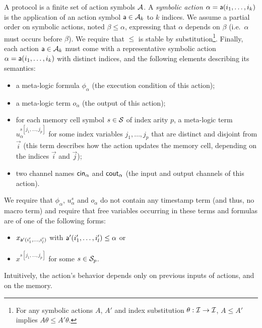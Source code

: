 \begin{definition} \label{def:action} \label{def:proto}
  A protocol is a finite set of action symbols $\mathcal{A}$.
  A \emph{symbolic action} $\alpha = \textsf{a}(i_1,\ldots,i_k)$
  is the application of an action symbol $\textsf{a} \in \mathcal{A}_k$
  to $k$ indices.
  We assume a partial order on symbolic actions,
  noted $\beta \leq \alpha$, expressing that $\alpha$ depends on $\beta$ (i.e.\ $\alpha$ must occurs before $\beta$). We require that $\leq$ is stable by substitution\footnote{
    For any symbolic actions $A$, $A'$ and index substitution $\theta : \mathcal{I} \to \mathcal{I}$,
    $A \leq A'$ implies $A\theta \leq A'\theta$.
  }.
  Finally, each action $\textsf{a} \in \mathcal{A}_k$ must come with
  a representative symbolic action $\alpha = \textsf{a}(i_1,\ldots,i_k)$
  with distinct indices,
  and the following elements describing its semantics:
  \begin{itemize}
    \item a meta-logic formula $\phi_{\alpha}$
      (the execution condition of this action);
    \item a meta-logic term $o_{\alpha}$
      (the output of this action);
    \item for each memory cell symbol $s \in \mathcal{S}$ of index arity $p$,
      a meta-logic term $u_{\alpha}^{s[j_1,\ldots,j_p]}$
      for some index variables $j_1,\ldots,j_p$
      that are distinct and disjoint from $\vec{i}$
      (this term describes how the action updates the memory
      cell, depending on the indices $\vec{i}$ and $\vec{j}$);
    \item two channel names $\mathsf{cin}_\alpha$ and $\mathsf{cout}_\alpha$
      (the input and output channels of this action).
  \end{itemize}
  We require that
  $\phi_{\alpha}$, $u_{\alpha}^{s}$ and $o_{\alpha}$ do not contain any
  timestamp term (and thus, no macro term) and require that
  free variables occurring in these terms and formulas are
  of one of the following forms:
  \begin{itemize}
    \item $x_{\textsf{a}'(i'_1,\ldots,i'_l)}$
      with $\textsf{a}'(i'_1,\ldots,i'_l)\leq \alpha$ or
    \item $x^{s[j_1,\ldots,j_p]}$
      for some $s \in \mathcal{S}_p$.
  \end{itemize}
  Intuitively, the action's behavior depends only on previous inputs of actions, and on the memory.
\end{definition}

